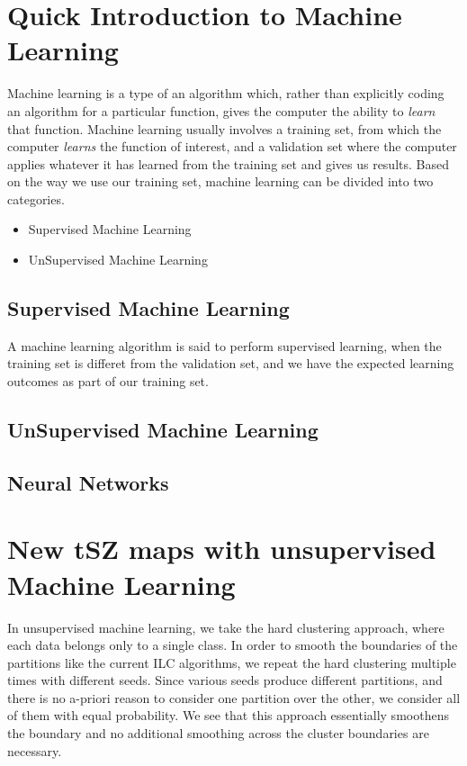 \section{Quick Introduction to Machine Learning}
Machine learning is a type of an algorithm which, rather than explicitly coding an algorithm for a
particular function, gives the computer the ability to \emph{learn} that function. Machine learning usually involves a
training set, from which the computer \emph{learns} the function of interest, and a validation set where the computer applies
whatever it has learned from the training set and gives us results.
Based on the way  we use our training set, machine learning can be divided into two categories.
\begin{itemize}
    \item Supervised Machine Learning
    \item UnSupervised Machine Learning
\end{itemize}

\subsection{Supervised Machine Learning}
A machine learning algorithm is said to perform supervised learning, when the training set is differet from the validation set, and we
have the expected learning outcomes as part of our training set.


\subsection{UnSupervised Machine Learning}

\subsection{Neural Networks}


\section{New tSZ maps with unsupervised Machine Learning}
\label{tSZmaps}
In unsupervised machine learning, we take the hard clustering approach,
where each data belongs only to a single class. In order to smooth the boundaries of the partitions
like the current ILC algorithms, we repeat the hard clustering multiple times with different seeds.
Since various seeds produce different partitions, and there is no a-priori reason to consider one
partition over the other, we consider all of them with equal probability. We see that this approach
essentially smoothens the boundary and no additional smoothing across the cluster boundaries are
necessary. 

